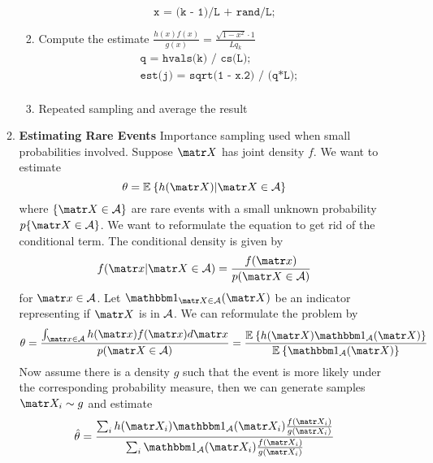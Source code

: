 \documentclass[11pt]{article}
\begin{document}
\begin{enumerate}
\begin{enumerate}
\begin{enumerate}
            \[
                \texttt{x = (k - 1)/L + rand/L;}  
            \]
            \item Compute the estimate $\textstyle\frac{h(x)f(x)}{g(x)}
            = \frac{\sqrt{1-x^2} \cdot 1}{Lq_k}$
            \begin{align*}
                &\texttt{ q = hvals(k) / cs(L);} \\ 
                &\texttt{ est(j) = sqrt(1 - x.\^{}2) / (q*L); } \\
            \end{align*}
            \item Repeated sampling and average the result
        \end{enumerate}
        \item \textbf{Estimating Rare Events} Importance sampling used when small probabilities involved. Suppose $\bX$ has joint density $f$. We want to estimate 
        \[
            \theta = \E{h(\bX) | \bX \in \calA}    
        \]
        where $\{\bX \in \calA \}$ are rare events with a small unknown probability $p\{\bX \in \calA \}$. We want to reformulate the equation to get rid of the conditional term. The conditional density is given by 
        \[
            f(\bx | \bX \in \calA ) = \frac{f(\bx)}{p(\bX \in \calA)}
        \]  
        for $\bx \in \calA$. Let $\indicator{\bX \in \calA}(\bX)$ be an indicator representing if $\bX$ is in $\mathcal{A}$. We can reformulate the problem by 
        \[
            \theta 
            = \frac{\int_{\bx \in \calA} h(\bx) f(\bx) d\bx}{p(\bX \in \calA)}
            = \frac{\E{h(\bX) \indicator{\calA}(\bX)}}{\E{\indicator{\calA}(\bX)}}
        \]
        Now assume there is a density $g$ such that the event is more likely under the corresponding probability measure, then we can generate samples $\bX_i \sim g$ and estimate 
        \[
            \hat{\theta} = 
            \frac{
                \sum_i h(\bX_i) \indicator{\calA}(\bX_i) \frac{f(\bX_i)}{g(\bX_i)}
            }{
                \sum_i \indicator{\calA}(\bX_i) \frac{f(\bX_i)}{g(\bX_i)}
            }
        \]
    \end{enumerate}
\end{enumerate}


 
\end{document}

